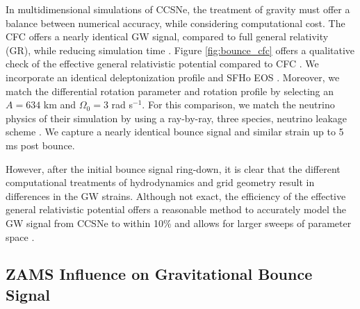 \documentclass[twocolumn,times]{aastex62}  %
\newcommand{\Msun}{\ensuremath{\mathrm{M}_\odot}\xspace}
\begin{document}
In multidimensional simulations of CCSNe, the treatment of gravity must offer a balance between numerical accuracy, while considering computational cost.   The CFC offers a nearly identical GW signal, compared to full general relativity (GR), while reducing simulation time \citep{ott:2007}.  Figure \ref{fig:bounce_cfc} offers a qualitative check of the effective general relativistic potential compared to CFC \citep{richers:2017}.  We incorporate an identical deleptonization profile \citep{lieb:2005} and SFHo EOS \citep{steiner:2013}.  Moreover, we match the differential rotation parameter and rotation profile by selecting an $A = 634$ km and $\Omega_0 = 3$ rad s$^{-1}$.  For this comparison, we match the neutrino physics of their simulation by using a ray-by-ray, three species, neutrino leakage scheme \citep{oconnor:2010,couch:2014}.  We capture a nearly identical bounce signal and similar strain up to 5 ms post bounce. \par
However, after the initial bounce signal ring-down, it is clear that the different computational treatments of hydrodynamics and grid geometry result in differences in the GW strains.  Although not exact, the efficiency of the effective general relativistic potential offers a reasonable method to accurately model the GW signal from CCSNe to within 10\% and allows for larger sweeps of parameter space \citep{muller:2013}.




\subsection{ZAMS Influence on Gravitational Bounce Signal}

\end{document}
